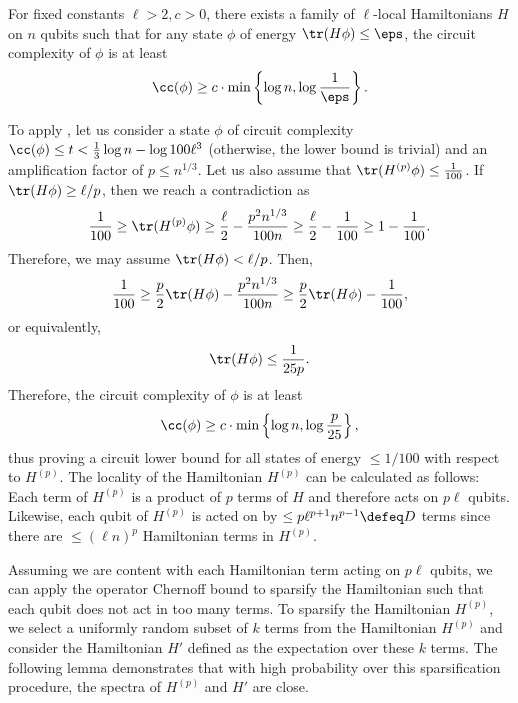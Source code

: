 \documentclass{toc}
\begin{document}
\begin{corollary}
For fixed constants $\ell > 2, c > 0$, there exists a family of $\ell$-local Hamiltonians $H$ on $n$ qubits such that for any state $\phi$ of energy $\tr(H\phi) \leq \eps$, the circuit complexity of $\phi$ is at least
\begin{align}
    \cc(\phi) \geq c \cdot \min \left\{ \log n, \log \frac{1}{\eps} \right\}.
\end{align}
\label{cor:reformulation}
\end{corollary}
To apply , let us consider a state $\phi$ of circuit complexity $\cc(\phi) \leq t < \frac{1}{3} \log n - \log 100 \ell^3$ (otherwise, the lower bound is trivial) and an amplification factor of $p \leq n^{1/3}$. Let us also assume that $\tr(H^{(p)} \phi) \leq \frac{1}{100}$. If $\tr(H \phi) \geq \ell / p$, then we reach a contradiction as
\begin{align}
    \frac{1}{100} \geq \tr(H^{(p)} \phi) \geq \frac{\ell}{2} - \frac{p^2 n^{1/3}}{100n} \geq \frac{\ell}{2} - \frac{1}{100} \geq 1 - \frac{1}{100}.
\end{align}
Therefore, we may assume $\tr(H \phi) < \ell / p$. Then,
\begin{align}
    \frac{1}{100} \geq \frac{p}{2} \tr(H \phi) - \frac{p^2 n^{1/3}}{100n} \geq \frac{p}{2} \tr(H \phi) - \frac{1}{100},
\end{align}
or equivalently,
\begin{align}
    \tr(H \phi) \leq \frac{1}{25 p}.
\end{align}
Therefore, the circuit complexity of $\phi$ is at least
\begin{align}
    \cc(\phi) \geq c \cdot \min \left\{ \log n, \log \frac{p}{25} \right\},
\end{align}
thus proving a circuit lower bound for all states of energy $\leq 1 / 100$ with respect to $H^{(p)}$. The locality of the Hamiltonian $H^{(p)}$ can be calculated as follows: Each term of $H^{(p)}$ is a product of $p$ terms of $H$ and therefore acts on $p \ell$ qubits. Likewise, each qubit of $H^{(p)}$ is acted on by $\leq p \ell^{p+1} n^{p-1} \defeq D$ terms since there are $\leq (\ell n)^p$ Hamiltonian terms in $H^{(p)}$. 


Assuming we are content with each Hamiltonian term acting on $p \ell$ qubits, we can apply the operator Chernoff bound to sparsify the Hamiltonian such that each qubit does not act in too many terms. To sparsify the Hamiltonian $H^{(p)}$, we select a uniformly random subset of $k$ terms from the Hamiltonian $H^{(p)}$ and consider the Hamiltonian $H'$ defined as the expectation over these $k$ terms. The following lemma demonstrates that with high probability over this sparsification procedure, the spectra of $H^{(p)}$ and $H'$ are close.
\end{document}

